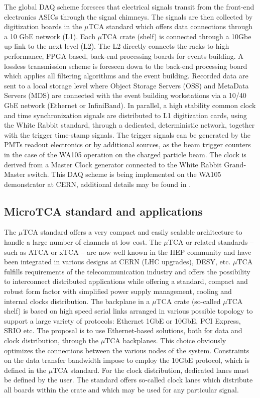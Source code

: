 The global DAQ scheme foresees that electrical signals transit from the front-end electronics ASICs through the signal chimneys. The signals are then collected by digitization boards in the $\mu$TCA standard which offers data connections through a 10 GbE network (L1). Each $\mu$TCA crate (shelf) is connected through a 10Gbe up-link to the next level (L2). The L2 directly connects the racks to high performance, FPGA based,  back-end processing boards for events building. A lossless transmission scheme is  foreseen down to the back-end processing board which applies all filtering algorithms and the event building. Recorded data are sent to a local storage level where Object Storage Servers (OSS) and MetaData Servers (MDS) are connected with the event building workstations via a 10/40 GbE network (Ethernet or InfiniBand). In parallel, a high stability common clock and time synchronization signals are distributed to L1 digitization cards, using the White Rabbit standard, through a dedicated, deterministic network, together with the trigger time-stamp signals. The trigger signals can be  generated by the  PMTs readout electronics or by additional sources, as the beam trigger counters in the case of the WA105 operation on the charged particle beam. The clock is derived from a Master Clock generator connected to the White Rabbit Grand-Master switch. This DAQ scheme is being implemented on the WA105 demonstrator at CERN, additional details may be found in \cite{WA105_TDR}.  

\subsection{MicroTCA standard and applications}
The $\mu$TCA standard offers a very compact and easily scalable architecture to handle a large number of channels at low cost. The $\mu$TCA or related standards -- such as ATCA or xTCA -- are now well known in the HEP community and have been integrated in various designs at CERN (LHC upgrades), DESY, etc.  $\mu$TCA fulfills requirements of the telecommunication industry and offers the possibility to interconnect distributed applications while offering a standard, compact and robust form factor with simplified power supply management, cooling and internal clocks distribution. The backplane in a $\mu$TCA crate  (so-called $\mu$TCA shelf)  is based on high speed serial links arranged in various possible topology to support a large variety of protocols: Ethernet 1GbE or 10GbE, PCI Express, SRIO etc. The proposal is to use Ethernet-based solutions, both for data and clock distribution, through the $\mu$TCA backplanes. This choice obviously optimizes the connections between the various nodes of the system. Constraints on the data transfer bandwidth impose to employ the 10GbE protocol, which is defined in the $\mu$TCA standard. For the clock distribution, dedicated lanes must be defined by the user. The standard offers so-called clock lanes which distribute all boards within the crate and which  may be used for any particular signal. 


